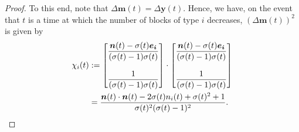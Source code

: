 \documentclass[12pt, leqno]{article}
\newcommand*{\norm}[1]{\lVert #1 \rVert}
\newcommand{\dd}{{\mathrm d}}
\begin{document}
\begin{proof}
To this end, 
note that $\Delta \bm m(t) = \Delta \bm y(t)$. 
Hence, we have, on the event that $t$ is a time at which the number of blocks of type $i$ decreases,  $(\Delta \bm m(t))^2$ is given by 
\begin{align*}
\chi_i(t)
&:= 
\begin{bmatrix}\dfrac{\bm n(t)-\sigma(t)\bm{e_i}}{(\sigma(t)-1)\sigma(t)}  \\ \\ \dfrac{1}{(\sigma(t)-1)\sigma(t)}\end{bmatrix}
\cdot
\begin{bmatrix}\dfrac{\bm n(t)-\sigma(t)\bm{e_i}}{(\sigma(t)-1)\sigma(t)}  \\ \\ \dfrac{1}{(\sigma(t)-1)\sigma(t)}\end{bmatrix}
\notag\\
&=\frac{\bm n(t)\cdot\bm n(t) -2\sigma(t)  n_i(t) + \sigma(t)^2+1}{\sigma(t)^2(\sigma(t)-1)^2}.
\end{align*}



\end{proof}
\end{document}
